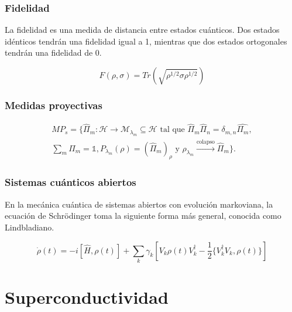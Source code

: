 \documentclass[xetex,mathserif,serif]{beamer}
\begin{document}
\begin{frame}
    \frametitle{Fidelidad}

    La fidelidad es una medida de distancia entre estados cuánticos. Dos estados idénticos tendrán una fidelidad igual a 1, mientras que dos estados ortogonales tendrán una fidelidad de 0.

    \begin{equation}
        F(\rho, \sigma) = Tr(\sqrt{\rho^{1/2} \sigma \rho^{1/2}})
    \end{equation}

\end{frame}

\begin{frame}
    \frametitle{Medidas proyectivas}

    \begin{equation}
        \begin{array}{r}
        MP_s = \{\hat{\Pi}_m: \mathcal{H} \rightarrow \mathcal{M}_{\lambda_m} \subseteq \mathcal{H} \text{ tal que } \hat{\Pi}_m \hat{\Pi}_n = \delta_{m,n} \hat{\Pi_m}, \\
        \sum\limits_m \hat{\Pi}_m = \mathds{1}, P_{\lambda_m}(\rho) = (\hat{\Pi}_m)_\rho \text{ y } \rho_{\lambda_m} \xrightarrow{\text{colapso}} \hat{\Pi}_m\} .
        \end{array}
    \end{equation}

\end{frame}

\begin{frame}
    \frametitle{Sistemas cuánticos abiertos}

    En la mecánica cuántica de sistemas abiertos con evolución markoviana, la ecuación de Schrödinger toma la siguiente forma más general, conocida como Lindbladiano.

    \begin{equation}
        \dot{\rho}(t) = -i [\hat{H}, \rho(t)] + \sum_k \gamma_k [V_k \rho(t) V_k^\dagger - \frac{1}{2} \{V_k^\dagger V_k, \rho(t)\}]
    \end{equation}

\end{frame}

\section{Superconductividad}
\end{document}
